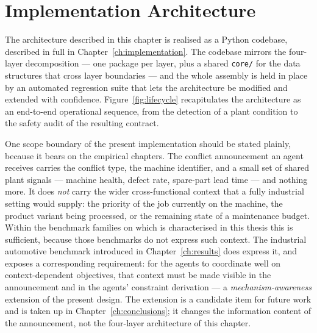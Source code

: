 \section{Implementation Architecture}
\label{sec:arch-impl}

The architecture described in this chapter is realised as a Python
codebase, described in full in Chapter~\ref{ch:implementation}. The
codebase mirrors the four-layer decomposition --- one package per
layer, plus a shared \texttt{core/} for the data structures that cross
layer boundaries --- and the whole assembly is held in place by an
automated regression suite that lets the architecture be modified and
extended with confidence. Figure~\ref{fig:lifecycle} recapitulates the
architecture as an end-to-end operational sequence, from the detection
of a plant condition to the safety audit of the resulting contract.


One scope boundary of the present implementation should be stated
plainly, because it bears on the empirical chapters. The conflict
announcement an agent receives carries the conflict type, the machine
identifier, and a small set of shared plant signals --- machine health,
defect rate, spare-part lead time --- and nothing more. It does
\emph{not} carry the wider cross-functional context that a fully
industrial setting would supply: the priority of the job currently on
the machine, the product variant being processed, or the remaining
state of a maintenance budget. Within the benchmark families on which
\NEXUS{} is characterised in this thesis this is sufficient, because
those benchmarks do not express such context. The industrial automotive
benchmark introduced in Chapter~\ref{ch:results} does express it, and
exposes a corresponding requirement: for the agents to coordinate well
on context-dependent objectives, that context must be made visible in
the announcement and in the agents' constraint derivation --- a
\emph{mechanism-awareness} extension of the present design. The
extension is a candidate item for future work and is taken up in
Chapter~\ref{ch:conclusions}; it changes the information content of the
announcement, not the four-layer architecture of this chapter.

